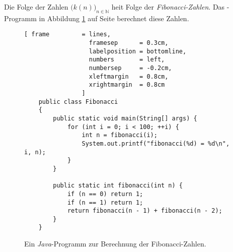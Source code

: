 Die Folge der Zahlen $\bigl(k(n)\bigr)_{n\in\mathbb{N}}$ hei\3t Folge der \emph{Fibonacci-Zahlen}.  Das \Java-Programm in Abbildung
\ref{fig:fibonacci} auf Seite \pageref{fig:fibonacci} berechnet diese Zahlen.

\begin{figure}[!h]
  \centering
\begin{Verbatim}[ frame         = lines, 
                  framesep      = 0.3cm, 
                  labelposition = bottomline,
                  numbers       = left,
                  numbersep     = -0.2cm,
                  xleftmargin   = 0.8cm,
                  xrightmargin  = 0.8cm
                ]
    public class Fibonacci 
    {
        public static void main(String[] args) {
            for (int i = 0; i < 100; ++i) {
                int n = fibonacci(i);
                System.out.printf("fibonacci(%d) = %d\n", i, n);
            }
        }
        
        public static int fibonacci(int n) {
            if (n == 0) return 1;
            if (n == 1) return 1;
            return fibonacci(n - 1) + fibonacci(n - 2);
        }
    }
\end{Verbatim}
\vspace*{-0.3cm}
  \caption{Ein \textsl{Java}-Programm zur Berechnung der Fibonacci-Zahlen.}
  \label{fig:fibonacci}
\end{figure} 

